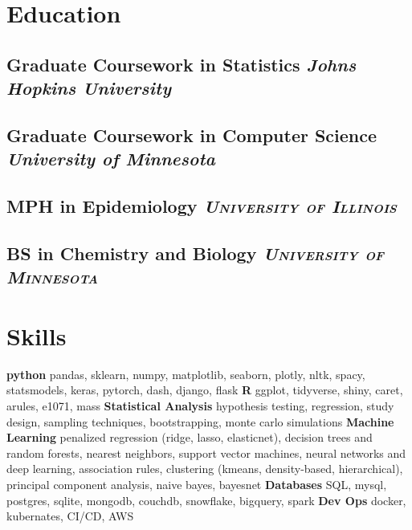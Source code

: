 \documentclass[11pt]{article}
\newcommand{\rside}[1]{
  \hfill {\itshape #1}%
}
\begin{document}
\section{Education}
\subsection{\normalfont Graduate Coursework in Statistics \rside{\normalfont Johns Hopkins University}}
\subsection{\normalfont Graduate Coursework in Computer Science \rside{\normalfont University of Minnesota}}
\subsection{MPH in Epidemiology \rside{\normalfont\large\bfseries\scshape{University of Illinois}}}
\subsection{BS in Chemistry and Biology \rside{\normalfont\large\bfseries\scshape{University of Minnesota}}}
\bigskip

\section{Skills}
\noindent\small \textbf{python} pandas, sklearn, numpy, matplotlib, seaborn, plotly, nltk, spacy, statsmodels, keras, pytorch, dash, django, flask \textbf{R} ggplot, tidyverse, shiny, caret, arules, e1071, mass \textbf{Statistical Analysis} hypothesis testing, regression, study design, sampling techniques, bootstrapping, monte carlo simulations \textbf{Machine Learning} penalized regression (ridge, lasso, elasticnet), decision trees and random forests, nearest neighbors, support vector machines, neural networks and deep learning, association rules, clustering (kmeans, density-based, hierarchical), principal component analysis, naive bayes, bayesnet  \textbf{Databases} SQL, mysql, postgres, sqlite, mongodb, couchdb, snowflake, bigquery, spark \textbf{Dev Ops} docker, kubernates, CI/CD, AWS
\end{document}
